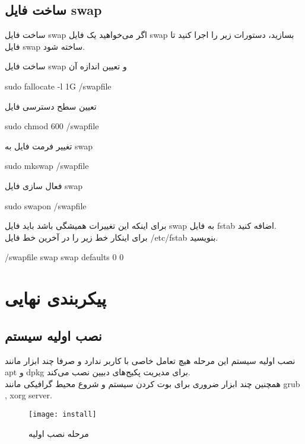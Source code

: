 \subsection{ساخت فایل swap}
\begin{frame}{ساخت فایل swap}
  اگر می‌خواهید یک فایل swap بسازید،‌ دستورات زیر را اجرا کنید تا فایل swap ساخته شود.
  \begin{alertblock}{ساخت فایل swap و تعیین اندازه آن}
    \begin{LTR}
    sudo fallocate -l 1G /swapfile
    \end{LTR}
  \end{alertblock}
  \begin{alertblock}{تعیین سطح دسترسی فایل}
    \begin{LTR}
    sudo chmod 600 /swapfile
    \end{LTR}
  \end{alertblock}
  \begin{alertblock}{تغییر فرمت فایل به swap}
    \begin{LTR}
    sudo mkswap /swapfile
    \end{LTR}
  \end{alertblock}
  \begin{alertblock}{فعال سازی فایل swap}
    \begin{LTR}
    sudo swapon /swapfile
    \end{LTR}
  \end{alertblock}  
  برای اینکه این تغییرات همیشگی باشد باید فایل swap به فایل fstab اضافه کنید.\\
  برای اینکار خط زیر را در آخرین خط فایل /etc/fstab بنویسید.
  \begin{LTR}
    /swapfile swap swap defaults 0 0
  \end{LTR}
\end{frame}
\section{پیکربندی نهایی}
\subsection{نصب اولیه سیستم}
\begin{frame}{نصب اولیه سیستم}
  این مرحله هیچ تعامل خاصی با کاربر ندارد و صرفا چند ابزار مانند apt و dpkg برای مدیریت پکیج‌های دبیین نصب می‌کند.\\
  همچنین چند ابزار ضروری برای بوت کردن سیستم و شروع محیط‌ گرافیکی مانند grub , xorg server.\\
  \begin{figure}
    \texttt{[image: install]}
    \caption{مرحله نصب اولیه~\cite{fig:deb_install}}
  \end{figure}
\end{frame}
